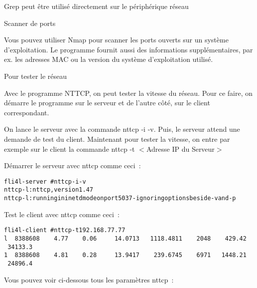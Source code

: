 \begin{description}
 Grep peut être utilisé directement sur le périphérique réseau

 Scanner de ports

	Vous pouvez utiliser Nmap pour scanner les ports ouverts sur un système d'exploitation.
	Le programme fournit aussi des informations supplémentaires, par ex. les adresses MAC
	ou la version du système d'exploitation utilisé.

 Pour tester le réseau

    Avec le programme NTTCP, on peut tester la vitesse du réseau. Pour ce faire, 
    on démarre le programme sur le serveur et de l'autre côté, sur le client correspondant.

    On lance le serveur avec la commande nttcp -i -v. Puis, le serveur attend une demande
    de test du client. Maintenant pour tester la vitesse, on entre par exemple
    sur le client la commande nttcp -t $<$Adresse IP du Serveur$>$

    Démarrer le serveur avec nttcp comme ceci~:

\begin{example}
\begin{alltt}
fli4l-server \version~\# nttcp -i -v
nttcp-l: nttcp, version 1.47
nttcp-l: running in inetd mode on port 5037 - ignoring options beside -v and -p
\end{alltt}
\end{example}

    Test le client avec nttcp comme ceci~:

\begin{example}
\begin{alltt}
fli4l-client \version~\# nttcp -t 192.168.77.77
l~~8388608~~~~4.77~~~~0.06~~~~~14.0713~~~1118.4811~~~~2048~~~~429.42~~~34133.3
1~~8388608~~~~4.81~~~~0.28~~~~~13.9417~~~~239.6745~~~~6971~~~1448.21~~~24896.4
\end{alltt}
\end{example}

    Vous pouvez voir ci-dessous tous les paramètres nttcp~:


\end{description}
